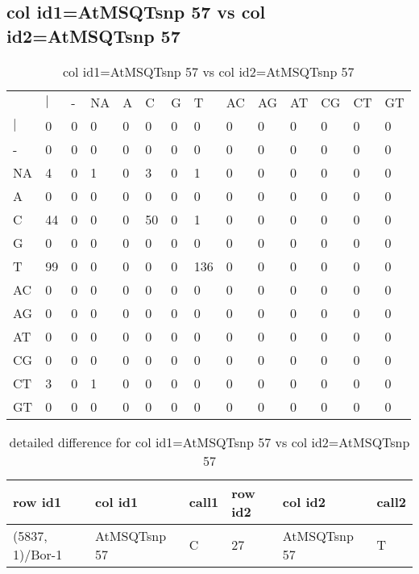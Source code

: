 \subsection{col id1=AtMSQTsnp 57 vs col id2=AtMSQTsnp 57}
\begin{center}
\begin{longtable}{|l|l|l|l|l|l|l|l|l|l|l|l|l|l|}
\caption{col id1=AtMSQTsnp 57 vs col id2=AtMSQTsnp 57} \label{table_dm946}\\
\hline
\\
\hline
&$|$&-&NA&A&C&G&T&AC&AG&AT&CG&CT&GT\\
$|$&0&0&0&0&0&0&0&0&0&0&0&0&0\\
-&0&0&0&0&0&0&0&0&0&0&0&0&0\\
NA&4&0&1&0&3&0&1&0&0&0&0&0&0\\
A&0&0&0&0&0&0&0&0&0&0&0&0&0\\
C&44&0&0&0&50&0&1&0&0&0&0&0&0\\
G&0&0&0&0&0&0&0&0&0&0&0&0&0\\
T&99&0&0&0&0&0&136&0&0&0&0&0&0\\
AC&0&0&0&0&0&0&0&0&0&0&0&0&0\\
AG&0&0&0&0&0&0&0&0&0&0&0&0&0\\
AT&0&0&0&0&0&0&0&0&0&0&0&0&0\\
CG&0&0&0&0&0&0&0&0&0&0&0&0&0\\
CT&3&0&1&0&0&0&0&0&0&0&0&0&0\\
GT&0&0&0&0&0&0&0&0&0&0&0&0&0\\
\hline
\end{longtable}
\end{center}

\begin{center}
\begin{longtable}{|l|l|l|l|l|l|}
\caption{detailed difference for col id1=AtMSQTsnp 57 vs col id2=AtMSQTsnp 57} \label{table_dm947}\\
\hline
row id1&col id1&call1&row id2&col id2&call2\\
\hline
(5837, 1)/Bor-1&AtMSQTsnp 57&C&27&AtMSQTsnp 57&T\\
\hline
\end{longtable}
\end{center}

